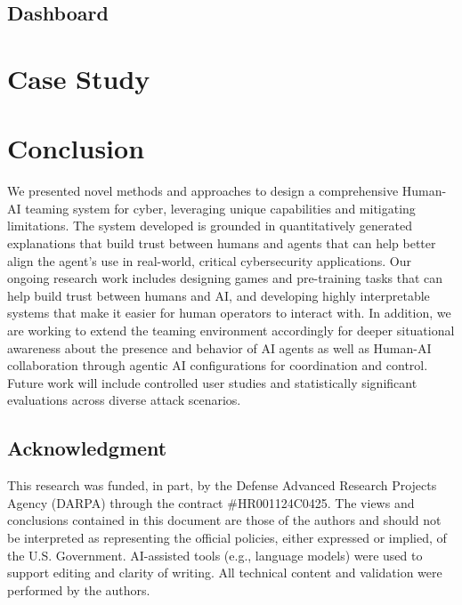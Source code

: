 \subsection{Dashboard}


\section{Case Study}


\section{Conclusion}
We presented novel methods and approaches to design a comprehensive Human-AI teaming
system for cyber, leveraging unique capabilities and mitigating limitations.
The system developed is grounded in quantitatively generated explanations that
build trust between humans and agents that can help better align the agent's use
in real-world, critical cybersecurity applications.
Our ongoing research work includes designing games and pre-training tasks that can
help build trust between humans and AI, and developing highly interpretable systems
that make it easier for human operators to interact with.
In addition, we are working to extend the teaming environment accordingly for deeper
situational awareness about the presence and behavior of AI agents as well as
Human-AI collaboration through agentic AI configurations for coordination and control.
Future work will include controlled user studies and statistically significant
evaluations across diverse attack scenarios.

\subsection*{Acknowledgment}
This research was funded, in part, by the Defense Advanced Research Projects Agency
(DARPA) through the contract \#HR001124C0425. The views and conclusions contained
in this document are those of the authors and should not be interpreted as representing
the official policies, either expressed or implied, of the U.S. Government.
AI-assisted tools (e.g., language models) were used to support editing and clarity
of writing. All technical content and validation were performed by the authors.
